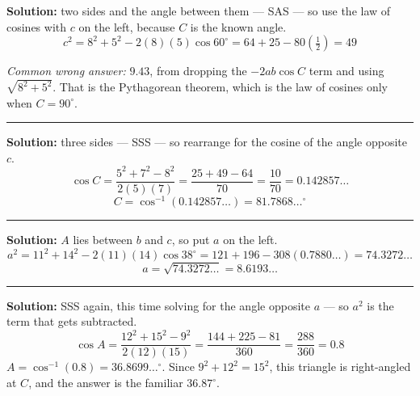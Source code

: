 \documentclass[12pt]{article}
\begin{document}



\textbf{Solution:} two sides and the angle between them --- SAS --- so use the law of cosines with $c$ on the left, because $C$ is the known angle.
\[ c^2 = 8^2 + 5^2 - 2(8)(5)\cos 60^\circ = 64 + 25 - 80\left(\tfrac{1}{2}\right) = 49 \]

\smallskip
\noindent\textit{Common wrong answer:} $9.43$, from dropping the $-2ab\cos C$ term and using $\sqrt{8^2 + 5^2}$. That is the Pythagorean theorem, which is the law of cosines only when $C = 90^\circ$.

\vspace{0.1cm}\noindent\rule{\linewidth}{0.2pt}\vspace{0.1cm}


\textbf{Solution:} three sides --- SSS --- so rearrange for the cosine of the angle opposite $c$.
\[ \cos C = \frac{5^2 + 7^2 - 8^2}{2(5)(7)} = \frac{25 + 49 - 64}{70} = \frac{10}{70} = 0.142857\ldots \]
\[ C = \cos^{-1}(0.142857\ldots) = 81.7868\ldots^\circ \]

\vspace{0.1cm}\noindent\rule{\linewidth}{0.2pt}\vspace{0.1cm}


\textbf{Solution:} $A$ lies between $b$ and $c$, so put $a$ on the left.
\[ a^2 = 11^2 + 14^2 - 2(11)(14)\cos 38^\circ = 121 + 196 - 308(0.7880\ldots) = 74.3272\ldots \]
\[ a = \sqrt{74.3272\ldots} = 8.6193\ldots \]

\vspace{0.1cm}\noindent\rule{\linewidth}{0.2pt}\vspace{0.1cm}


\textbf{Solution:} SSS again, this time solving for the angle opposite $a$ --- so $a^2$ is the term that gets subtracted.
\[ \cos A = \frac{12^2 + 15^2 - 9^2}{2(12)(15)} = \frac{144 + 225 - 81}{360} = \frac{288}{360} = 0.8 \]
$A = \cos^{-1}(0.8) = 36.8699\ldots^\circ$. Since $9^2 + 12^2 = 15^2$, this triangle is right-angled at $C$, and the answer is the familiar $36.87^\circ$. 
\end{document}
